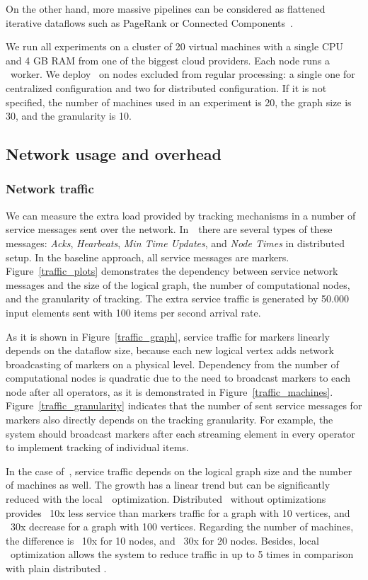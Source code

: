 On the other hand, more massive pipelines can be considered as flattened iterative dataflows such as PageRank or Connected Components~\cite{Murray:2013:NTD:2517349.2522738, xu2016efficient}. 

We run all experiments on a cluster of 20 virtual machines with a single CPU and 4 GB RAM from one of the biggest cloud providers. Each node runs a \FlameStream\ worker. We deploy \tracker\ on nodes excluded from regular processing: a single one for centralized configuration and two for distributed configuration. If it is not specified, the number of machines used in an experiment is 20, the graph size is 30, and the granularity is 10. 

\subsection{Network usage and overhead} \label{overhead}

\subsubsection{Network traffic}

We can measure the extra load provided by tracking mechanisms in a number of service messages sent over the network. In~\tracker\ there are several types of these messages: {\em Acks}, {\em Hearbeats}, {\em Min Time Updates}, and {\em Node Times} in distributed setup. In the baseline approach, all service messages are markers. Figure~\ref{traffic_plots} demonstrates the dependency between service network messages and the size of the logical graph, the number of computational nodes, and the granularity of tracking. The extra service traffic is generated by 50.000 input elements sent with 100 items per second arrival rate. 

As it is shown in Figure~\ref{traffic_graph}, service traffic for markers linearly depends on the dataflow size, because each new logical vertex adds network broadcasting of markers on a physical level. Dependency from the number of computational nodes is quadratic due to the need to broadcast markers to each node after all operators, as it is demonstrated in Figure~\ref{traffic_machines}. Figure~\ref{traffic_granularity} indicates that the number of sent service messages for markers also directly depends on the tracking granularity. For example, the system should broadcast markers after each streaming element in every operator to implement tracking of individual items. 

In the case of~\tracker , service traffic depends on the logical graph size and the number of machines as well. 
The growth has a linear trend but can be significantly reduced with the local~\tracker\ optimization. Distributed \tracker\ without optimizations provides ~10x less service than markers traffic for a graph with 10 vertices, and ~30x decrease for a graph with 100 vertices. Regarding the number of machines, the difference is ~10x for 10 nodes, and ~30x for 20 nodes. Besides, local \tracker\ optimization allows the system to reduce traffic in up to 5 times in comparison with plain distributed \tracker .

